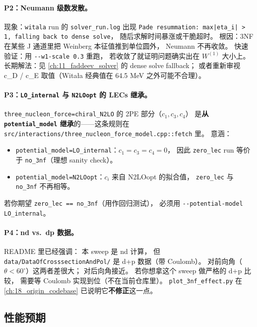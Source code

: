 \paragraph{P2：Neumann 级数发散。}
现象：\texttt{witala} run 的 \texttt{solver\_run.log} 出现
\texttt{Pade resummation: max|eta\_i| > 1, falling back to dense solve}，
随后求解时间暴涨或干脆超时。
根因：3NF 在某些 J 通道里把 Weinberg 本征值推到单位圆外，
Neumann 不再收敛。
快速验证：用 \texttt{-{}-w1-scale 0.3} 重跑，
若收敛了就证明问题确实出在 $W^{(1)}$ 大小上。
长期解法：见 \cref{ch:11_faddeev_solver} 的 dense solve fallback；
或者重新审视 c\_D / c\_E 取值（Witała 经典值在 64.5 MeV 之外可能不合理）。

\paragraph{P3：\texttt{LO\_internal} 与 \texttt{N2LOopt} 的 LECs 继承。}
\texttt{three\_nucleon\_force=chiral\_N2LO} 的 2PE 部分（$c_1, c_3, c_4$）
是\textbf{从 \texttt{potential\_model} 继承}的——这条规则在 \texttt{src/interactions/three\_nucleon\_force\_model.cpp::fetch} 里。
意涵：
\begin{itemize}
  \item \texttt{potential\_model=LO\_internal}：$c_1=c_3=c_4=0$，
        因此 \texttt{zero\_lec} run 等价于 \texttt{no\_3nf}（理想 sanity check）。
  \item \texttt{potential\_model=N2LOopt}：$c_i$ 来自 N2LOopt 的拟合值，
        \texttt{zero\_lec} 与 \texttt{no\_3nf} 不再相等。
\end{itemize}
若你期望 \texttt{zero\_lec == no\_3nf}（用作回归测试），
必须用 \texttt{-{}-potential-model LO\_internal}。

\paragraph{P4：nd vs.\ dp 数据。}
README 里已经强调：
本 sweep 是 nd 计算，
但 \texttt{data/DataOfCrosssectionAndPol/} 是 d+p 数据（带 Coulomb）。
对前向角（$\theta < 60^\circ$）这两者差很大；
对后向角接近。
若你想拿这个 sweep 做严格的 d+p 比较，
需要等 Coulomb 实现到位（不在当前仓库里）。
\texttt{plot\_3nf\_effect.py} 在 \cref{ch:18_origin_codebase} 已说明它\textbf{不修正}这一点。

\subsection{性能预期}
\label{sec:ch20-s3-perf}

